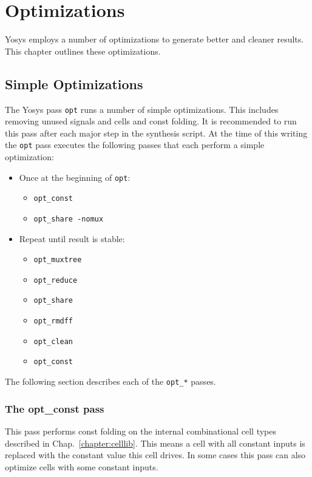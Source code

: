 
\chapter{Optimizations}
\label{chapter:opt}

Yosys employs a number of optimizations to generate better and cleaner results.
This chapter outlines these optimizations.

\section{Simple Optimizations}

The Yosys pass {\tt opt} runs a number of simple optimizations. This includes removing unused
signals and cells and const folding. It is recommended to run this pass after each major step
in the synthesis script. At the time of this writing the {\tt opt} pass executes the following
passes that each perform a simple optimization:

\begin{itemize}
\item Once at the beginning of {\tt opt}:
\begin{itemize}
\item {\tt opt\_const}
\item {\tt opt\_share -nomux}
\end{itemize}
\item Repeat until result is stable:
\begin{itemize}
\item {\tt opt\_muxtree}
\item {\tt opt\_reduce}
\item {\tt opt\_share}
\item {\tt opt\_rmdff}
\item {\tt opt\_clean}
\item {\tt opt\_const}
\end{itemize}
\end{itemize}

The following section describes each of the {\tt opt\_*} passes.

\subsection{The opt\_const pass}

This pass performs const folding on the internal combinational cell types
described in Chap.~\ref{chapter:celllib}. This means a cell with all constant
inputs is replaced with the constant value this cell drives. In some cases
this pass can also optimize cells with some constant inputs.

